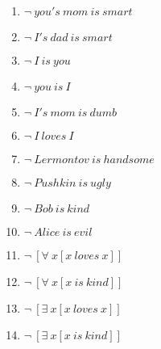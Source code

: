 \documentclass{article}
\begin{document}
\begin{enumerate}
\item $\neg \ you's \ mom \ is \ smart$

\item $\neg \ I's \ dad \ is \ smart$

\item $\neg \ I \ is \ you$

\item $\neg \ you \ is \ I$

\item $\neg \ I's \ mom \ is \ dumb$

\item $\neg \ I \ loves \ I$

\item $\neg \ Lermontov \ is \ handsome$

\item $\neg \ Pushkin \ is \ ugly$

\item $\neg \ Bob \ is \ kind$

\item $\neg \ Alice \ is \ evil$

\item $\neg \ [\forall \ x[x \ loves \ x]]$

\item $\neg \ [\forall \ x[x \ is \ kind]]$

\item $\neg \ [\exists \ x[x \ loves \ x]]$

\item $\neg \ [\exists \ x[x \ is \ kind]]$

\end{enumerate}
\end{document}
